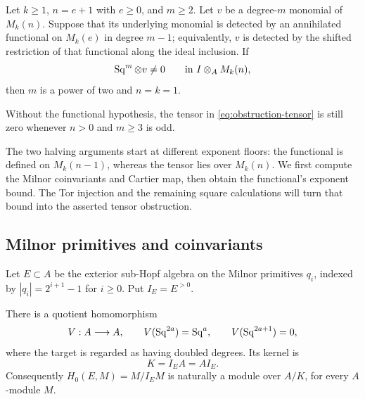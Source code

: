 \begin{lemma}\label{lem:algebra-obstruction}
Let $k\geq1$, $n=e+1$ with $e\geq0$, and $m\geq2$.  Let $v$ be
a degree-$m$ monomial of $M_k(n)$.  Suppose that its underlying
monomial is detected by an annihilated functional on $M_k(e)$ in
degree $m-1$; equivalently, $v$ is detected by the shifted restriction
of that functional along the ideal inclusion.
If
\begin{equation}\label{eq:obstruction-tensor}
 \operatorname{Sq}^m\otimes v\neq0
       \qquad\text{in } I\otimes_AM_k(n),
\end{equation}
then $m$ is a power of two and $n=k=1$.

Without the functional hypothesis, the tensor in
\eqref{eq:obstruction-tensor} is still zero whenever $n>0$ and
$m\geq3$ is odd.
\end{lemma}

The two halving arguments start at different exponent floors: the
functional is defined on $M_k(n-1)$, whereas the tensor lies over
$M_k(n)$. We first compute the Milnor coinvariants and Cartier map,
then obtain the functional's exponent bound. The Tor injection and
the remaining square calculations will turn that bound into the
asserted tensor obstruction.

\subsection{Milnor primitives and coinvariants}

Let $E\subset A$ be the exterior sub-Hopf algebra on the Milnor
primitives $q_i$, indexed by
$|q_i|=2^{i+1}-1$ for $i\geq0$.  Put $I_E=E^{>0}$.

\begin{lemma}\label{lem:algebra-milnor-quotient}
There is a quotient homomorphism
\[
 V:A\longrightarrow A,\qquad
 V(\operatorname{Sq}^{2a})=\operatorname{Sq}^a,\qquad V(\operatorname{Sq}^{2a+1})=0,
\]
where the target is regarded as having doubled degrees.  Its kernel is
\[
 K=I_EA=AI_E.
\]
Consequently $H_0(E,M)=M/I_EM$ is naturally a module over
$A/K$, for every $A$-module $M$.
\end{lemma}

